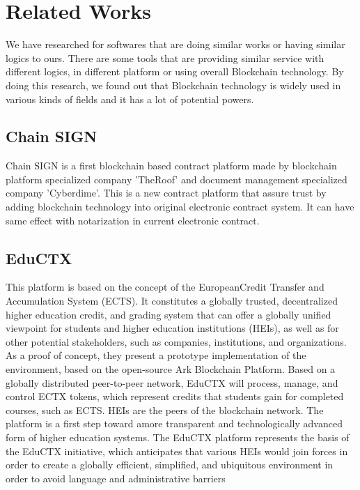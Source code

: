 \documentclass[conference]{IEEEtran}
\begin{document}
\section{Related Works}
We have researched for softwares that are doing similar works or having similar logics to ours. There are some tools that are providing similar service with different logics, in different platform or using overall Blockchain technology. By doing this research, we found out that Blockchain technology is widely used in various kinds of fields and it has a lot of potential powers. 

\subsection{Chain SIGN}
Chain SIGN is a first blockchain based contract platform made by blockchain platform specialized company 'TheRoof' and document management specialized company 'Cyberdime'. This is a new contract platform that assure trust by adding blockchain technology into original electronic contract system. It can have same effect with notarization in current electronic contract.

\subsection{EduCTX}
This platform is based on the concept of the EuropeanCredit Transfer and Accumulation System (ECTS). It constitutes a globally trusted, decentralized higher education credit, and grading system that can offer a globally unified viewpoint for students and higher education institutions (HEIs), as well as for other potential stakeholders, such as companies, institutions, and organizations. As a proof of concept, they present a prototype implementation of the environment, based on the open-source Ark Blockchain Platform. Based on a globally distributed peer-to-peer network, EduCTX will process, manage, and control ECTX tokens, which represent credits that students gain for completed courses, such as ECTS. HEIs are the peers of the blockchain network. The platform is a first step toward amore transparent and technologically advanced form of higher education systems. The EduCTX platform represents the basis of the EduCTX initiative, which anticipates that various HEIs would join forces in order to create a globally efficient, simplified, and ubiquitous environment in order to avoid language and administrative barriers
\end{document}
